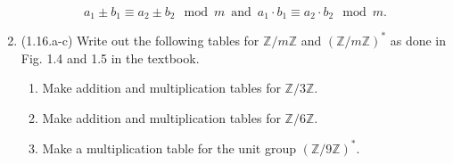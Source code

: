 \documentclass[12pt]{amsart}
\theoremstyle{definition}
\begin{document}
\begin{enumerate}
\begin{displaymath}
			a_1 \pm b_1 \equiv a_2 \pm b_2 \mod m \ \operatorname{and} \ a_1 \cdot b_1 \equiv 
			a_2 \cdot b_2 \mod m. 
		\end{displaymath}
	\item (1.16.a-c) Write out the following tables for $\mathbb{Z}/m\mathbb{Z}$ and 
		$(\mathbb{Z}/m\mathbb{Z})^\ast$ as done in Fig. 1.4 and 1.5 in the textbook. 
		\begin{enumerate}
			\item Make addition and multiplication tables for $\mathbb{Z}/3\mathbb{Z}$. 
			\item Make addition and multiplication tables for $\mathbb{Z}/6\mathbb{Z}$.
			\item Make a multiplication table for the unit group $(\mathbb{Z}/9\mathbb{Z})^\ast$. 
		\end{enumerate}
			
\end{enumerate}
\end{document}
